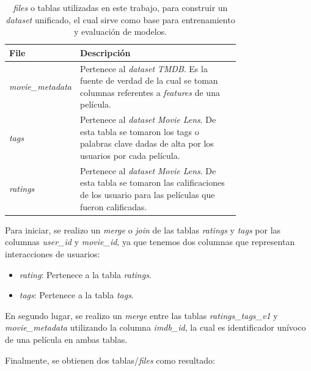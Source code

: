 \documentclass[11pt,a4paper,twoside]{thesis}
\begin{document}
\begin{table}[!htb]
	\centering
	\footnotesize
	\begin{tabular}{l | p{0.75\linewidth}}
		\hline
		File                     & Descripción                                                                                                                                              \\
		\hline
		\textit{movie\_metadata} & Pertenece al \textit{dataset} \textit{TMDB}. Es la fuente de verdad de la cual se toman columnas referentes a \textit{features} de una película.         \\
		\textit{tags}            & Pertenece al \textit{dataset} \textit{Movie Lens}. De esta tabla se tomaron los tags o palabras clave dadas de alta por los usuarios por cada película.  \\
		\textit{ratings}         & Pertenece al \textit{dataset} \textit{Movie Lens}. De esta tabla se tomaron las calificaciones de los usuario para las películas que fueron calificadas. \\
		\hline
	\end{tabular}
	\caption{
		\textit{files} o tablas utilizadas en este trabajo, para construir un \textit{dataset} unificado, el cual sirve como base para entrenamiento y evaluación de modelos.
	}
	\label{table:tableRatings}
\end{table}

Para iniciar, se realizo un \textit{merge} o \textit{join} de las tablas
\textit{ratings} y \textit{tags} por las columnas \textit{user\_id} y
\textit{movie\_id}, ya que tenemos dos columnas que representan interacciones
de usuarios:

\begin{itemize}
	\item \textit{rating}: Pertenece a la tabla \textit{ratings}.
	\item \textit{tags}: Pertenece a la tabla \textit{tags}.
\end{itemize}

En segundo lugar, se realizo un \textit{merge} entre las tablas
\textit{ratings\_tags\_v1} y \textit{movie\_metadata} utilizando la columna
\textit{imdb\_id}, la cual es identificador unívoco de una película en ambas
tablas.

Finalmente, se obtienen dos tablas/\textit{files} como resultado:
\end{document}
